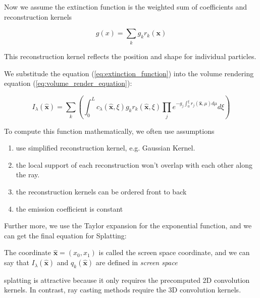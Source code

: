 



Now we assume the extinction function is the weighted 
sum of coefficients and reconstruction kernels

\begin{equation}
g(x)=\sum\limits_{k}\limits^{} g_kr_k(\mathbf{x})
\label{eq:extinction_function}
\end{equation}

This reconstruction kernel reflects the position and shape for individual particles.

We substitude the equation (\ref{eq:extinction_function}) into the volume rendering equation (\ref{eq:volume_render_equation}):

$$I_{\lambda}(\hat{\mathbf{x}})=
\sum\limits_{k}\limits^{} 
(
    \int_0^L c_\lambda(\hat{\mathbf{x}},\xi)g_kr_k(\hat{\mathbf{x}},\xi)
    \prod\limits_{j }\limits^{} e^{
        -g_j \int_0^\xi r_j(\hat{\mathbf{x}},\mu)d\mu
    } d\xi
)$$

To compute this function mathematically, we often use assumptions

\begin{enumerate}
    \item use simplified reconstruction kernel, e.g. Gaussian Kernel.
    \item the local support of each reconstruction won't overlap with each other along the ray.
    \item the reconstruction kernels can be ordered front to back
    \item the emission coefficient is constant 
\end{enumerate}

Further more, we use the Taylor expansion for the exponential function, and we can get the final equation for Splatting:



The coordinate $\hat{\mathbf{x}}=(x_0,x_1)$ is called the screen space coordinate, and we can say that $I_\lambda(\hat{\mathbf{x}})$ and $q_k(\hat{\mathbf{x}})$ are defined in \textit{screen space}

splatting is attractive because it only requires the precomputed 2D convolution kernels. In contrast, ray casting methods require the 3D convolution kernels.
